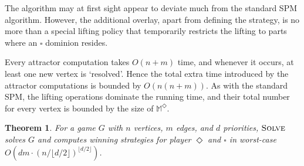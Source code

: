 \documentclass{eptcs}
\newtheorem{theo}{Theorem}
\newenvironment{theorem}{\begin{theo} \rm }{\end{theo}}
\newcommand{\odd}{\ensuremath{\square}\xspace}
\newcommand{\even}{\ensuremath{\Diamond}\xspace}
\def\runtimefloor{O(dm \cdot (n/\lfloor d / 2 \rfloor)^{\lfloor d/2 \rfloor})}
\begin{document}
The algorithm may at first sight appear to deviate much from the
standard SPM algorithm. However, the additional overlay, apart from
defining the strategy, is no more than a special lifting policy that
temporarily restricts the lifting to parts where an \odd dominion
resides. \medskip

Every attractor computation takes $O(n+m)$
time, and whenever it occurs, at least one new vertex is `resolved'.
Hence the total extra time introduced by the attractor computations
is bounded by $O(n(n+m))$. As with the standard SPM, the lifting
operations dominate the running time, and their total number for
every vertex is bounded by the size of $\mathbb{M}^{\even}$.
\begin{theorem}
For a game $G$ with $n$ vertices, $m$ edges, and
$d$ priorities, $\textsc{Solve}$ solves $G$ and computes winning
strategies for player $\even$ and $\odd$ in worst-case $\runtimefloor$.
\end{theorem}
\end{document}

